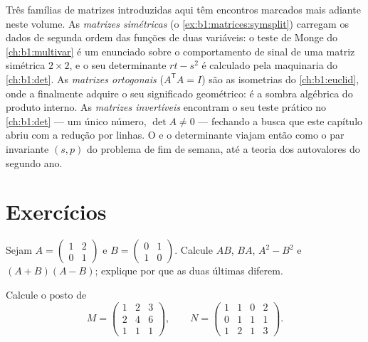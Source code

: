 \begin{remark}
\label{rem:b1:matrices:perspectives}
Três famílias de matrizes introduzidas aqui têm encontros marcados
mais adiante neste volume. As \emph{matrizes simétricas}
(o \cref{ex:b1:matrices:symsplit}) carregam os dados de segunda ordem das funções de duas
variáveis: o teste de Monge do \cref{ch:b1:multivar} é um enunciado sobre o
comportamento de sinal de uma matriz simétrica $2\times2$, e o seu
determinante $rt - s^2$ é calculado pela maquinaria do \cref{ch:b1:det}. As
\emph{matrizes ortogonais} ($A^{\mathsf T}A = I$) são as isometrias do \cref{ch:b1:euclid}, onde
a  finalmente adquire o seu significado geométrico: é a
sombra algébrica do produto interno. As \emph{matrizes invertíveis}
encontram o seu teste prático no \cref{ch:b1:det} --- um único número, $\det A \neq 0$
--- fechando a busca que este capítulo abriu com a redução por
linhas. O  e o determinante viajam então como o par invariante
$(s, p)$ do problema de fim de semana, até a teoria dos autovalores
do segundo ano.
\end{remark}

\section{Exercícios}

\begin{exercise}[$\star$]\label{exo:b1:matrices:1}
Sejam $A = \begin{pmatrix} 1 & 2 \\ 0 & 1 \end{pmatrix}$ e $B =
\begin{pmatrix} 0 & 1 \\ 1 & 0\end{pmatrix}$. Calcule $AB$, $BA$, $A^2 - B^2$ e $(A+B)(A-B)$; explique por
que as duas últimas diferem.
\end{exercise}

\begin{exercise}[$\star$]\label{exo:b1:matrices:2}
Calcule o posto de
\[
M = \begin{pmatrix}
1 & 2 & 3\\
2 & 4 & 6\\
1 & 1 & 1
\end{pmatrix},
\qquad
N = \begin{pmatrix}
1 & 1 & 0 & 2\\
0 & 1 & 1 & 1\\
1 & 2 & 1 & 3
\end{pmatrix}.
\]
\end{exercise}

